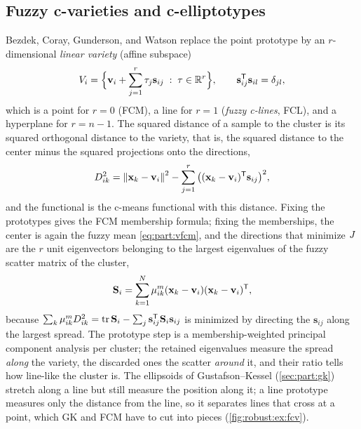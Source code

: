 \subsection{Fuzzy c-varieties and c-elliptotypes}\label{sec:robust:fcv}

Bezdek, Coray, Gunderson, and Watson \cite{bezdek:1981:fcv1,bezdek:1981:fcv2} replace the point prototype by an $r$-dimensional \emph{linear variety} (affine subspace)
\begin{equation}
  V_i=\Big\{\mathbf{v}_i+\sum_{j=1}^{r}\tau_j\mathbf{s}_{ij}\;:\;\tau\in\mathbb{R}^r\Big\},\qquad \mathbf{s}_{ij}^{\mathsf{T}}\mathbf{s}_{il}=\delta_{jl},
\end{equation}
which is a point for $r=0$ (FCM), a line for $r=1$ (\emph{fuzzy c-lines}, FCL), and a hyperplane for $r=n-1$. The squared distance of a sample to the cluster is its squared orthogonal distance to the variety, that is, the squared distance to the center minus the squared projections onto the directions,
\begin{equation}
  D^2_{ik}=\left\lVert \mathbf{x}_k-\mathbf{v}_i \right\rVert^2-\sum_{j=1}^{r}\big((\mathbf{x}_k-\mathbf{v}_i)^{\mathsf{T}}\mathbf{s}_{ij}\big)^2 ,
  \label{eq:robust:dfcv}
\end{equation}
and the functional is the c-means functional with this distance. Fixing the prototypes gives the FCM membership formula; fixing the memberships, the center is again the fuzzy mean \eqref{eq:part:vfcm}, and the directions that minimize $J$ are the $r$ unit eigenvectors belonging to the largest eigenvalues of the fuzzy scatter matrix of the cluster,
\begin{equation}
  \mathbf{S}_i=\sum_{k=1}^{N}\mu_{ik}^m(\mathbf{x}_k-\mathbf{v}_i)(\mathbf{x}_k-\mathbf{v}_i)^{\mathsf{T}} ,
  \label{eq:robust:scatter}
\end{equation}
because $\sum_k\mu_{ik}^mD^2_{ik}=\operatorname{tr}\mathbf{S}_i-\sum_j\mathbf{s}_{ij}^{\mathsf{T}}\mathbf{S}_i\mathbf{s}_{ij}$ is minimized by directing the $\mathbf{s}_{ij}$ along the largest spread. The prototype step is a membership-weighted principal component analysis per cluster; the retained eigenvalues measure the spread \emph{along} the variety, the discarded ones the scatter \emph{around} it, and their ratio tells how line-like the cluster is. The ellipsoids of Gustafson--Kessel (\cref{sec:part:gk}) stretch along a line but still measure the position along it; a line prototype measures only the distance from the line, so it separates lines that cross at a point, which GK and FCM have to cut into pieces (\cref{fig:robust:ex:fcv}).


